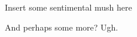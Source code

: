 \thispagestyle{empty}
{}

\vspace*{3cm}

\begin{center}
    Insert some sentimental mush here  
\end{center}

\medskip

\begin{center}
    And perhaps some more? Ugh.
\end{center}